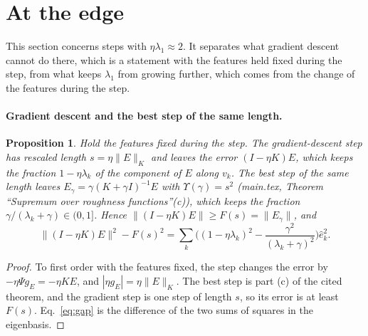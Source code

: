 \documentclass[11pt]{article}
\newtheorem{proposition}{Proposition}
\theoremstyle{definition}
\theoremstyle{remark}
\begin{document}
\section{At the edge}\label{sec:edge}

This section concerns steps with $\eta\lambda_1\approx2$.
It separates what gradient descent cannot do there, which is a statement with the features held fixed during the step, from what keeps $\lambda_1$ from growing further, which comes from the change of the features during the step.

\paragraph{Gradient descent and the best step of the same length.}

\begin{proposition}\label{prop:best}
Hold the features fixed during the step. The gradient-descent step has rescaled length $s = \eta\|E\|_K$ and leaves the error $(I - \eta K)E$, which keeps the fraction $1 - \eta\lambda_k$ of the component of $E$ along $v_k$. The best step of the same length leaves $E_\gamma = \gamma(K + \gamma I)^{-1}E$ with $\Upsilon(\gamma) = s^2$ (main.tex, Theorem ``Supremum over roughness functions''(c)), which keeps the fraction $\gamma/(\lambda_k + \gamma)\in(0,1]$. Hence $\|(I - \eta K)E\|\ge F(s) = \|E_\gamma\|$, and
\begin{equation}\label{eq:gap}
\|(I - \eta K)E\|^2 - F(s)^2 = \sum_k\Big((1 - \eta\lambda_k)^2 - \frac{\gamma^2}{(\lambda_k + \gamma)^2}\Big)\hat e_k^2 .
\end{equation}
\end{proposition}

\begin{proof}
To first order with the features fixed, the step changes the error by $-\eta\Psi g_E = -\eta KE$, and $|\eta g_E| = \eta\|E\|_K$. The best step is part (c) of the cited theorem, and the gradient step is one step of length $s$, so its error is at least $F(s)$. Eq.~\eqref{eq:gap} is the difference of the two sums of squares in the eigenbasis.
\end{proof}
\end{document}
